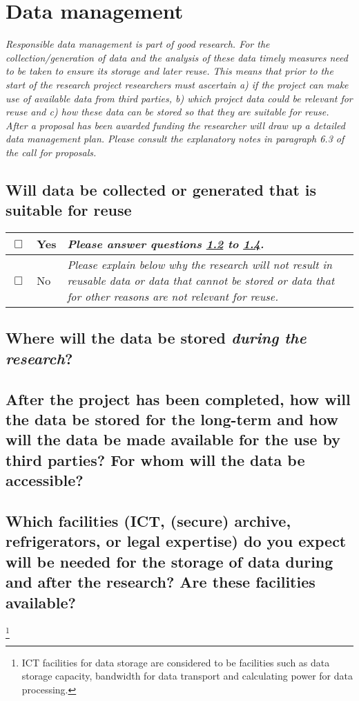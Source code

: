 \noindent{}

\section{Data management}\label{data}
\textit{Responsible data management is part of good research. For the collection/generation of data and the analysis of these data timely measures need to be taken to ensure its storage and later reuse. This means that prior to the start of the research project researchers must ascertain a) if the project can make use of available data from third parties, b) which project data could be relevant for reuse and c) how these data can be stored so that they are suitable for reuse.
After a proposal has been awarded funding the researcher will draw up a detailed data management plan. Please consult the explanatory notes in paragraph 6.3 of the call for proposals.}

\subsection{Will data be collected or generated that is suitable for reuse}

\begin{tabular}{|c|l|p{11cm}|}
\hline
	$\Box$ & Yes & \textit{Please answer questions \ref{data_during} to \ref{data_secure}.} \\
\hline
\hline
	$\Box$ & No & \textit{Please explain below why the research will not result in reusable data or data that cannot be stored or data that for other reasons are not relevant for reuse.} \\
\hline
\end{tabular}

\subsection{Where will the data be stored \textit{during the research}?}\label{data_during}

\subsection{After the project has been completed, how will the data be stored for the long-term and how will the data be made available for the use by third parties? For whom will the data be accessible?}

\subsection{Which facilities (ICT, (secure) archive, refrigerators, or legal expertise) do you expect will be needed for the storage of data during and after the research? Are these facilities available?}\label{data_secure}\footnote{ICT facilities for data storage are considered to be facilities such as data storage capacity, bandwidth for data transport and calculating power for data processing.}